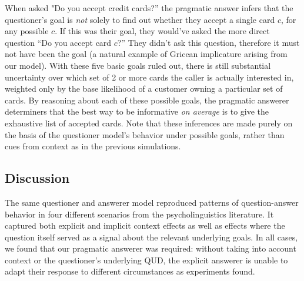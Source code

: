 \documentclass[12pt, floatsintext, jou]{apa6}
\begin{document}
When asked "Do you accept credit cards?'' the pragmatic answer infers that the questioner's goal is \emph{not} solely to find out whether they accept a single card $c$, for any possible $c$. If this was their goal, they would've asked the more direct question ``Do you accept card $c$?'' They didn't ask this question, therefore it must not have been the goal (a natural example of Gricean implicature arising from our model). With these five basic goals ruled out, there is still substantial uncertainty over which set of 2 or more cards the caller is actually interested in, weighted only by the base likelihood of a customer owning a particular set of cards. By reasoning about each of these possible goals, the pragmatic answerer determiners that the best way to be informative \emph{on average} is to give the exhaustive list of accepted cards. Note that these inferences are made purely on the basis of the questioner model's behavior under possible goals, rather than cues from context as in the previous simulations.

\subsection{Discussion}

The same questioner and answerer model reproduced patterns of question-answer behavior in four different scenarios from the psycholinguistics literature. It captured both explicit and implicit context effects as well as effects where the question itself served as a signal about the relevant underlying goals. In all cases, we found that our pragmatic answerer was required: without taking into account context or the questioner's underlying QUD, the explicit answerer is unable to adapt their response to different circumstances as experiments found.
\end{document}
